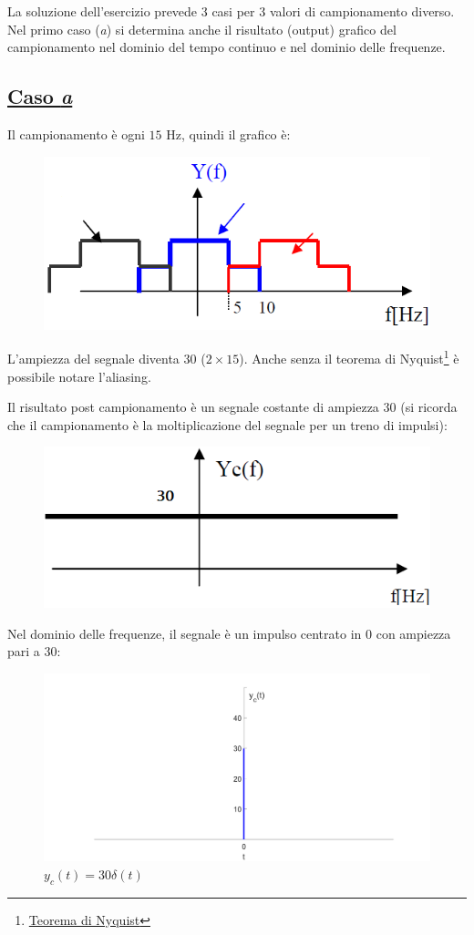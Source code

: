 \documentclass[a4paper]{article}
\begin{document}
	La soluzione dell'esercizio prevede 3 casi per 3 valori di campionamento diverso. Nel primo caso (\emph{a}) si determina anche il risultato (output) grafico del campionamento nel dominio del tempo continuo e nel dominio delle frequenze.
	
	\subsection*{\textcolor{Green4}{\underline{Caso \emph{a}}}}
	
	Il campionamento è ogni $15$ Hz, quindi il grafico è:
	\begin{figure}[!htp]
		\centering
		\includegraphics[width=.4\textwidth]{img/fig_4.png}
	\end{figure}

	\noindent
	L'ampiezza del segnale diventa $30$ ($2 \times 15$). Anche senza il teorema di Nyquist\footnote{\href{https://it.wikipedia.org/wiki/Teorema_del_campionamento_di_Nyquist-Shannon}{Teorema di Nyquist}} è possibile notare l'aliasing.\newline
	
	\noindent
	Il risultato post campionamento è un segnale costante di ampiezza $30$ (si ricorda che il campionamento è la moltiplicazione del segnale per un treno di impulsi):
	\begin{figure}[!htp]
		\centering
		\includegraphics[width=.4\textwidth]{img/fig_5.png}
	\end{figure}

	\noindent
	Nel dominio delle frequenze, il segnale è un impulso centrato in $0$ con ampiezza pari a $30$:
	\begin{figure}[!htp]
		\centering
		\includegraphics[width=\textwidth]{img/fig_6.png}
		\caption*{$y_{c}\left(t\right) = 30\delta\left(t\right)$}
	\end{figure}
	
\end{document}
